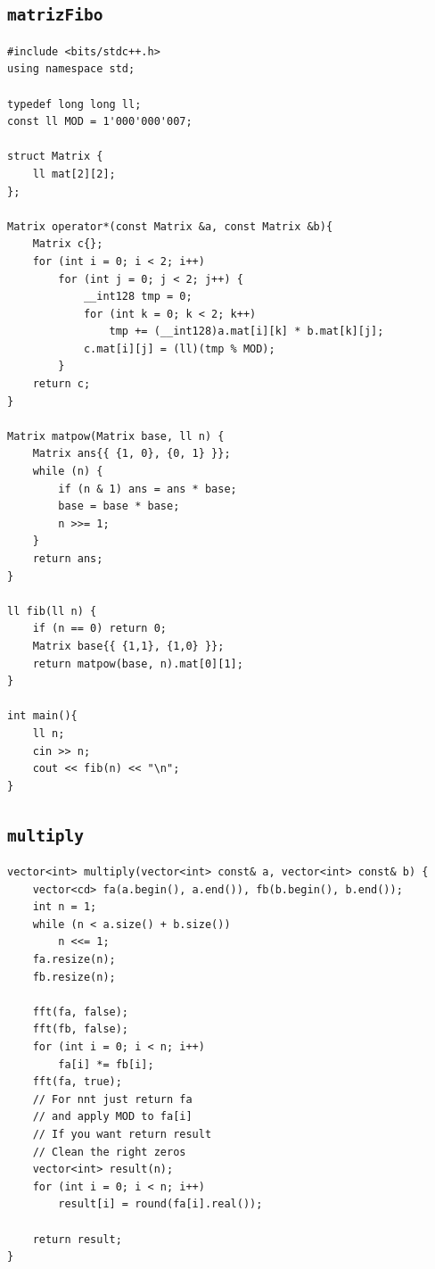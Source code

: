\subsection{\texttt{matrizFibo}}
\begin{lstlisting}
#include <bits/stdc++.h>
using namespace std;

typedef long long ll;
const ll MOD = 1'000'000'007;

struct Matrix {
    ll mat[2][2];
};

Matrix operator*(const Matrix &a, const Matrix &b){
    Matrix c{};
    for (int i = 0; i < 2; i++)
        for (int j = 0; j < 2; j++) {
            __int128 tmp = 0;
            for (int k = 0; k < 2; k++)
                tmp += (__int128)a.mat[i][k] * b.mat[k][j];
            c.mat[i][j] = (ll)(tmp % MOD);
        }
    return c;
}

Matrix matpow(Matrix base, ll n) {
    Matrix ans{{ {1, 0}, {0, 1} }};
    while (n) {
        if (n & 1) ans = ans * base;
        base = base * base;
        n >>= 1;
    }
    return ans;
}

ll fib(ll n) {
    if (n == 0) return 0;
    Matrix base{{ {1,1}, {1,0} }};
    return matpow(base, n).mat[0][1];
}

int main(){
    ll n;
    cin >> n;
    cout << fib(n) << "\n";
}
\end{lstlisting}

\subsection{\texttt{multiply}}
\begin{lstlisting}
vector<int> multiply(vector<int> const& a, vector<int> const& b) {
    vector<cd> fa(a.begin(), a.end()), fb(b.begin(), b.end());
    int n = 1;
    while (n < a.size() + b.size()) 
        n <<= 1;
    fa.resize(n);
    fb.resize(n);

    fft(fa, false);
    fft(fb, false);
    for (int i = 0; i < n; i++)
        fa[i] *= fb[i];
    fft(fa, true);
    // For nnt just return fa
    // and apply MOD to fa[i]
    // If you want return result
    // Clean the right zeros
    vector<int> result(n);
    for (int i = 0; i < n; i++)
        result[i] = round(fa[i].real());
    
    return result;
}\end{lstlisting}

